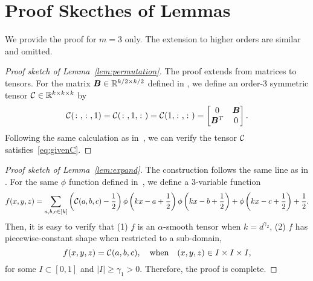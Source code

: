 \documentclass[11pt]{article}
\theoremstyle{definition}
\begin{document}
\section{Proof Skecthes of Lemmas}
We provide the proof for $m=3$ only. The extension to higher orders are similar and omitted. 

\begin{proof}[Proof sketch of Lemma~\ref{lem:permutation}]
The proof extends \citet[Theorem 2.2, page 26]{gao2015rate} from matrices to tensors. 
For the matrix $\bm B\in\mathbb{R}^{k/2\times k/2}$ defined in \citet[Theorem 2.2, page]{gao2015rate}, we define an order-3 symmetric tensor $\mathcal{C}\in\mathbb{R}^{k\times k\times k}$ by
\[
\mathcal{C}(\colon,\colon,1)=\mathcal{C}(\colon,1,\colon)=\mathcal{C}(1,\colon,\colon)=
\begin{bmatrix}
0&\bm B\\
\bm B^T&0
\end{bmatrix}.
\]
Following the same calculation as in~\cite{gao2015rate}, we can verify the tensor $\mathcal{C}$ satisfies~\eqref{eq:givenC}.
\end{proof}

\begin{proof}[Proof sketch of Lemma~\ref{lem:expand}]
The construction follows the same line as in \citet[Supplement, page 3]{gao2015rate}. For the same $\phi$ function defined in~\cite{gao2015rate}, we define a 3-variable function
\[
f(x,y,z)=\sum_{a,b,c\in[k]}\left(\mathcal{C}(a,b,c)-{1\over 2}\right)\phi\left(kx-a+{1\over 2}\right)\phi\left(kx-b+{1\over 2}\right)+\phi\left(kx-c+{1\over 2}\right)+{1\over 2}.
\]
Then, it is easy to verify that (1) $f$ is an $\alpha$-smooth tensor when $k=d^{\gamma_2}$, (2) $f$ has piecewise-constant shape when restricted to a sub-domain,
\[
f(x,y,z)=\mathcal{C}(a,b,c),\quad \text{when}\quad (x,y,z)\in I\times I\times I,
\]
for some $I\subset[0,1]$ and $|I|\geq \gamma_1>0$. Therefore, the proof is complete. 
\end{proof}


\end{document}
